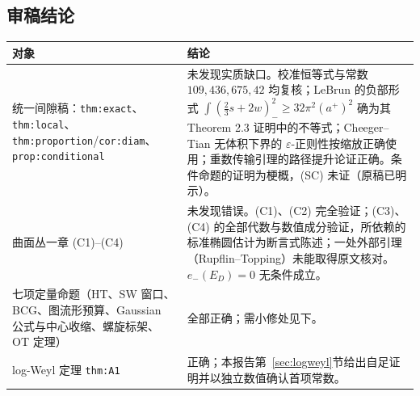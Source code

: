 \subsection{审稿结论}
\begin{longtable}{L{0.34\textwidth}L{0.58\textwidth}}
\toprule 对象 & 结论\\\midrule\endhead
统一间隙稿：\texttt{thm:exact}、\texttt{thm:local}、\texttt{thm:proportion}/\texttt{cor:diam}、\texttt{prop:conditional} & 未发现实质缺口。校准恒等式与常数 $109,436,675,42$ 均复核；LeBrun 的负部形式 $\int(\frac23s+2w)_-^2\ge32\pi^2(a^+)^2$ 确为其 Theorem 2.3 证明中的不等式；Cheeger--Tian 无体积下界的 $\varepsilon$-正则性按缩放正确使用；重数传输引理的路径提升论证正确。条件命题的证明为梗概，(SC) 未证（原稿已明示）。\\
曲面丛一章 (C1)--(C4) & 未发现错误。(C1)、(C2) 完全验证；(C3)、(C4) 的全部代数与数值成分验证，所依赖的标准椭圆估计为断言式陈述；一处外部引理（Rupflin--Topping）未能取得原文核对。$e_-(E_D)=0$ 无条件成立。\\
七项定量命题（HT、SW 窗口、BCG、图流形预算、Gaussian 公式与中心收缩、螺旋标架、OT 定理） & 全部正确；需小修处见下。\\
log-Weyl 定理 \texttt{thm:A1} & 正确；本报告第~\ref{sec:logweyl}节给出自足证明并以独立数值确认首项常数。\\
\bottomrule
\end{longtable}

